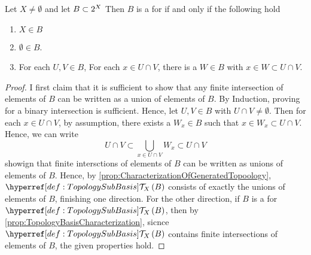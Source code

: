 \begin{prop}
\label{prop:BasisOfGeneratedTopology}
    Let $X \neq \emptyset$ and let 
    $B \subset 2^{X}$
    Then $B$ is a 
    \TopologyBasis 
    for 
    if and only if 
    the following hold
    \begin{enumerate}
        \item $X \in B$
        \item $\emptyset \in B$. 
        \item For each $U,V \in B$, For each $x \in U \cap V$, there is a $W \in B$ with $x \in W \subset U \cap V$. 
    \end{enumerate}
    \begin{proof}
        I first claim that 
        it is sufficient to show that any finite intersection of elements of $B$ can 
        be written as a union of elements of $B$.
        By Induction, proving for a binary intersection is sufficient. 
        Hence, let $U,V \in B$ with $U \cap V \neq \emptyset$. 
        Then for each $x \in U \cap V$, by assumption, 
        there exists a $W_x \in B$ such that 
        $x \in W_x \subset U \cap V$. 
        Hence, we can write 
        \begin{equation*}
            U \cap V \subset \bigcup_{x \in U \cap V} W_x \subset U \cap V
        \end{equation*}
        showign that finite intersctions of 
        elements of $B$ can be written as unions of 
        elements of $B$. 
        Hence, by
        \ref{prop:CharacterizationOfGeneratedTopoology}, 
        $\scGeneratedTopology{X}{B}$ 
        consists of exactly the unions of elements of $B$, finishing one direction.
        For the other direction, 
        if $B$ is a 
        \TopologyBasis
        for $\scGeneratedTopology{X}{B}$, 
        then 
        by 
        \ref{prop:TopologyBasisCharacterization}, 
        sicnce $\scGeneratedTopology{X}{B}$ 
        contains finite intersections of elements of $B$, 
        the given properties hold. 
       
        

    \end{proof}
\end{prop}
